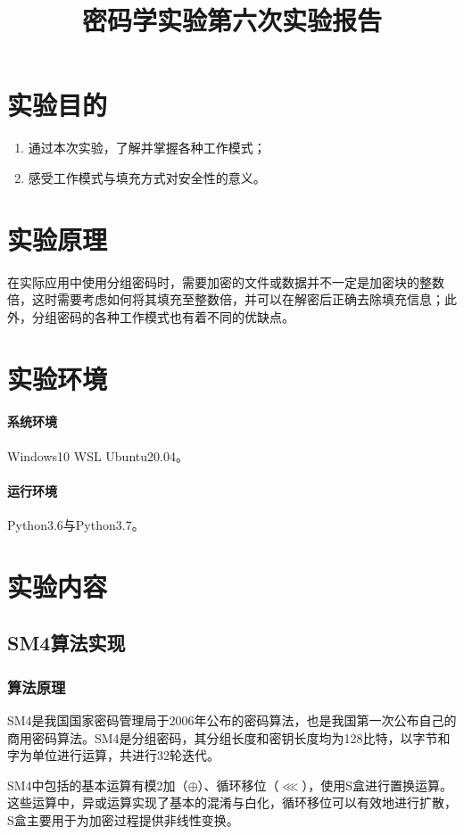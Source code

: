 \documentclass[a4paper, zihao=-4, UTF-8]{ctexart}
\title{\textbf{密码学实验第六次实验报告} }
\date{}
\begin{document}
	\maketitle
	\tableofcontents
	\newpage
	\section{实验目的}
	\begin{enumerate}[1.]
		\item 通过本次实验，了解并掌握各种工作模式；
		\item 感受工作模式与填充方式对安全性的意义。
	\end{enumerate}
	\section{实验原理}
		在实际应用中使用分组密码时，需要加密的文件或数据并不一定是加密块的整数倍，这时需要考虑如何将其填充至整数倍，并可以在解密后正确去除填充信息；此外，分组密码的各种工作模式也有着不同的优缺点。
	\section{实验环境}
	\paragraph*{系统环境} Windows10 WSL Ubuntu20.04。
	\paragraph*{运行环境} Python3.6与Python3.7。
	\section{实验内容}
		\subsection{SM4算法实现}
			\subsubsection{算法原理}
				SM4是我国国家密码管理局于2006年公布的密码算法，也是我国第一次公布自己的商用密码算法。SM4是分组密码，其分组长度和密钥长度均为128比特，以字节和字为单位进行运算，共进行32轮迭代。
				
				SM4中包括的基本运算有模2加（$\oplus$）、循环移位（$\lll$），使用S盒进行置换运算。这些运算中，异或运算实现了基本的混淆与白化，循环移位可以有效地进行扩散，S盒主要用于为加密过程提供非线性变换。
\end{document}
